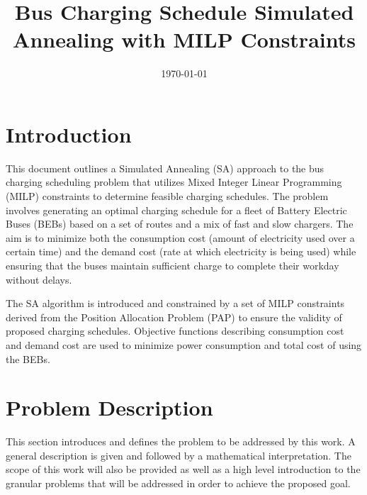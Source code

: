 \documentclass[11pt,a4paper,final]{article}
\date{\today}
\title{Bus Charging Schedule Simulated Annealing with MILP Constraints}
\begin{document}
\maketitle
\tableofcontents

\parskip 3mm                                %
\let\ref\autoref                            %

\section{Introduction}
\label{sec:introduction}
This document outlines a Simulated Annealing (SA) approach to the bus charging scheduling problem that utilizes Mixed
Integer Linear Programming (MILP) constraints to determine feasible charging schedules. The problem involves generating
an optimal charging schedule for a fleet of Battery Electric Buses (BEBs) based on a set of routes and a mix of fast and
slow chargers. The aim is to minimize both the consumption cost (amount of electricity used over a certain time) and the
demand cost (rate at which electricity is being used) while ensuring that the buses maintain sufficient charge to
complete their workday without delays.

The SA algorithm is introduced and constrained by a set of MILP constraints derived from the Position Allocation Problem
(PAP) to ensure the validity of proposed charging schedules. Objective functions describing consumption cost and demand
cost are used to minimize power consumption and total cost of using the BEBs.
\section{Problem Description}
\label{sec:problem-description}
This section introduces and defines the problem to be addressed by this work. A general description is given and
followed by a mathematical interpretation. The scope of this work will also be provided as well as a high level
introduction to the granular problems that will be addressed in order to achieve the proposed goal.
\end{document}
